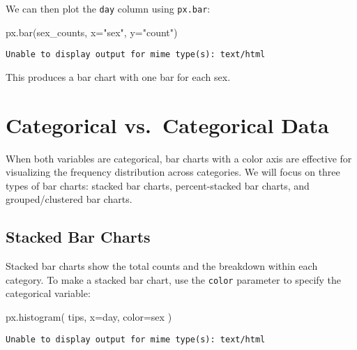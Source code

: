 \documentclass[
  letterpaper,
  DIV=11,
  numbers=noendperiod]{scrreprt}
\newenvironment{Shaded}{\begin{snugshade}}{\end{snugshade}}
\newcommand{\NormalTok}[1]{\textcolor[rgb]{0.00,0.23,0.31}{#1}}
\newcommand{\OperatorTok}[1]{\textcolor[rgb]{0.37,0.37,0.37}{#1}}
\newcommand{\StringTok}[1]{\textcolor[rgb]{0.13,0.47,0.30}{#1}}
\begin{document}
\begin{tcolorbox}
We can then plot the \texttt{day} column using \texttt{px.bar}:

\begin{Shaded}
\begin{Highlighting}[]
\NormalTok{px.bar(sex\_counts, x}\OperatorTok{=}\StringTok{"sex"}\NormalTok{, y}\OperatorTok{=}\StringTok{"count"}\NormalTok{)}
\end{Highlighting}
\end{Shaded}

\begin{verbatim}
Unable to display output for mime type(s): text/html
\end{verbatim}

This produces a bar chart with one bar for each sex.

\end{tcolorbox}

\section{Categorical vs.~Categorical
Data}\label{categorical-vs.-categorical-data}

When both variables are categorical, bar charts with a color axis are
effective for visualizing the frequency distribution across categories.
We will focus on three types of bar charts: stacked bar charts,
percent-stacked bar charts, and grouped/clustered bar charts.

\subsection{Stacked Bar Charts}\label{stacked-bar-charts}

Stacked bar charts show the total counts and the breakdown within each
category. To make a stacked bar chart, use the \texttt{color} parameter
to specify the categorical variable:

\begin{Shaded}
\begin{Highlighting}[]
\NormalTok{px.histogram(}
\NormalTok{    tips,}
\NormalTok{    x}\OperatorTok{=}\StringTok{\textquotesingle{}day\textquotesingle{}}\NormalTok{,}
\NormalTok{    color}\OperatorTok{=}\StringTok{\textquotesingle{}sex\textquotesingle{}}
\NormalTok{)}
\end{Highlighting}
\end{Shaded}

\begin{verbatim}
Unable to display output for mime type(s): text/html
\end{verbatim}
\end{document}
